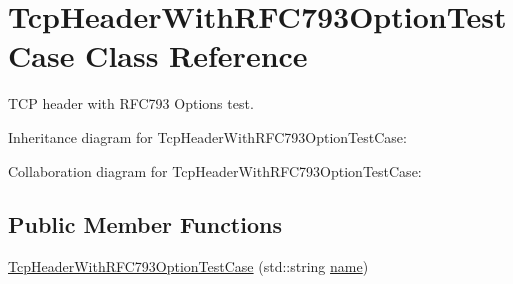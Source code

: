 \hypertarget{classTcpHeaderWithRFC793OptionTestCase}{}\section{Tcp\+Header\+With\+R\+F\+C793\+Option\+Test\+Case Class Reference}
\label{classTcpHeaderWithRFC793OptionTestCase}


T\+CP header with R\+F\+C793 Options test.  




Inheritance diagram for Tcp\+Header\+With\+R\+F\+C793\+Option\+Test\+Case\+:


Collaboration diagram for Tcp\+Header\+With\+R\+F\+C793\+Option\+Test\+Case\+:
\subsection*{Public Member Functions}
\begin{DoxyCompactItemize}
\item 
\hyperlink{classTcpHeaderWithRFC793OptionTestCase_a51246b228d2b211a21e29c0d91400735}{Tcp\+Header\+With\+R\+F\+C793\+Option\+Test\+Case} (std\+::string \hyperlink{generate__test__data__lte__spectrum__model_8m_ab74e6bf80237ddc4109968cedc58c151}{name})
\end{DoxyCompactItemize}
